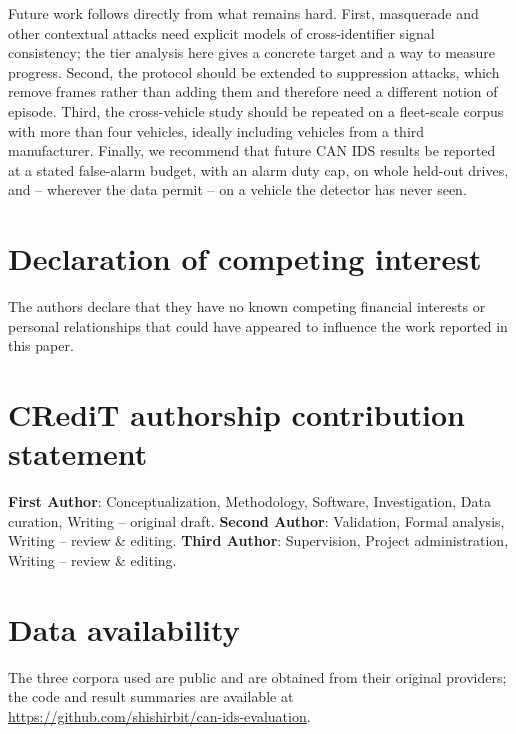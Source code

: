 \documentclass[preprint,11pt,authoryear]{elsarticle}
\begin{document}
Future work follows directly from what remains hard. First, masquerade and other contextual attacks
need explicit models of cross-identifier signal consistency; the tier analysis here gives a concrete
target and a way to measure progress. Second, the protocol should be extended to suppression
attacks, which remove frames rather than adding them and therefore need a different notion of
episode. Third, the cross-vehicle study should be repeated on a fleet-scale corpus with more than
four vehicles, ideally including vehicles from a third manufacturer. Finally, we recommend that
future CAN IDS results be reported at a stated false-alarm budget, with an alarm duty cap, on whole
held-out drives, and -- wherever the data permit -- on a vehicle the detector has never seen.

\section*{Declaration of competing interest}
The authors declare that they have no known competing financial interests or personal relationships
that could have appeared to influence the work reported in this paper.

\section*{CRediT authorship contribution statement}
\textbf{First Author}: Conceptualization, Methodology, Software, Investigation, Data curation,
Writing -- original draft. \textbf{Second Author}: Validation, Formal analysis, Writing -- review \&
editing. \textbf{Third Author}: Supervision, Project administration, Writing -- review \& editing.

\section*{Data availability}
The three corpora used are public and are obtained from their original providers; the code and
result summaries are available at \url{https://github.com/shishirbit/can-ids-evaluation}.



\end{document}
